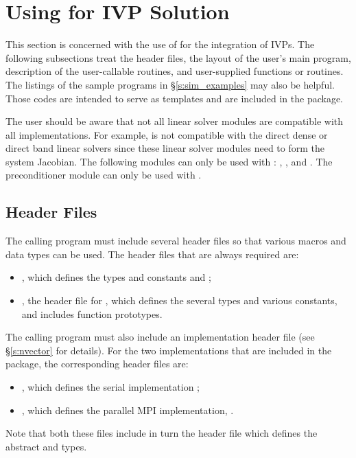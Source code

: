 \section{Using {\cvode} for IVP Solution}\label{s:simulation}

This section is concerned with the use of {\cvode} for the integration of IVPs.
The following subsections treat the header files, the layout of the user's main
program, description of the {\cvode} user-callable routines, and user-supplied functions 
or routines. The listings of the sample programs in \S\ref{s:sim_examples} may also be helpful. 
Those codes are intended to serve as templates and are included in the {\cvode} package.

The user should be aware that not all linear solver modules are compatible 
with all {\nvector} implementations. 
For example, {\nvecp} is not compatible with the direct dense or direct band 
linear solvers since these linear solver modules need to form the system Jacobian.
The following {\cvode} modules can only be used with {\nvecs}:
{\cvdense}, {\cvband}, and {\cvbandpre}. The preconditioner module {\cvbbdpre}
can only be used with {\nvecp}. 

\subsection{Header Files}\label{ss:header_sim}

The calling program must include several header files so that various macros
and data types can be used. The header files that are always required are:
%
\begin{itemize}
\item  {}, 
  which defines the types 
  and constants  and ;
\item  {}, 
  the header file for {\cvode}, which defines the several
  types and various constants, and includes function prototypes.
\end{itemize}
%
The calling program must also include an {\nvector} implementation header file
(see \S\ref{s:nvector} for details).
For the two {\nvector} implementations that are included in the {\cvode} package,
the corresponding header files are:
%
\begin{itemize}
\item {}, 
  which defines the serial implementation {\nvecs};
\item {}, 
  which defines the parallel MPI implementation, {\nvecp}.
\end{itemize}
%
Note that both these files include in turn the header file  which 
defines the abstract  and  types. 

